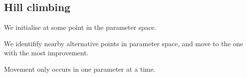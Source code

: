 
\subsection{Hill climbing}

We initialise at some point in the parameter space.

We identifify nearby alternative points in parameter space, and move to the one with the most improvement.

Movement only occurs in one parameter at a time.

